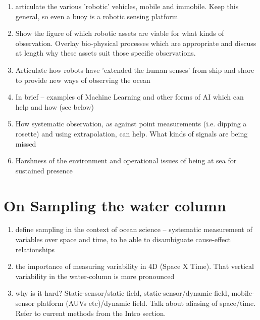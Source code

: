 \documentclass[12pt]{article}
\begin{document}
\begin{enumerate} 

  \item articulate the various 'robotic' vehicles, mobile and
    immobile. Keep this general, so even a buoy is a robotic sensing
    platform 

  \item Show the figure of which robotic assets are viable for what
    kinds of observation. Overlay bio-physical processes which are
    appropriate and discuss at length why these assets suit those
    specific observations.

  \item Articulate how robots have 'extended the human senses' from
    ship and shore to provide new ways of observing the ocean

  \item In brief -- examples of Machine Learning and other forms of AI
    which can help and how (see below)

  \item How systematic observation, as against point measurements
    (i.e. dipping a rosette) and using extrapolation, can help. What
    kinds of signals are being missed

  \item Harshness of the environment and operational issues of being
    at sea for sustained presence

\end{enumerate}

  
\section{On Sampling the water column}

\begin{enumerate} 

\item define sampling in the context of ocean science -- systematic
  measurement of variables over space and time, to be able to
  disambiguate cause-effect relationships

\item the importance of measuring variability in 4D (Space X
  Time). That vertical variability in the water-column is more
  pronounced 
  
\item why is it hard? Static-sensor/static field,
  static-sensor/dynamic field, mobile-sensor platform (AUVs
  etc)/dynamic field. Talk about aliasing of space/time. Refer to
  current methods from the Intro section.

\end{enumerate}
\end{document}
